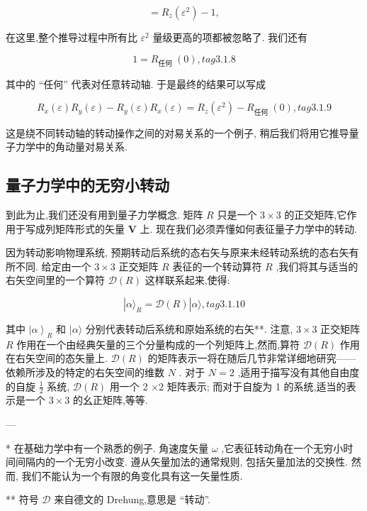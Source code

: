 $$
= {R}_{z}\left( {\varepsilon }^{2}\right) - 1,
$$

在这里,整个推导过程中所有比 ${\varepsilon }^{2}$ 量级更高的项都被忽略了. 我们还有

$$
1 = {R}_{\text{任何 }}\left( 0\right) , tag{3.1.8}
$$

其中的 “任何” 代表对任意转动轴. 于是最终的结果可以写成

$$
{R}_{x}\left( \varepsilon \right) {R}_{y}\left( \varepsilon \right) - {R}_{y}\left( \varepsilon \right) {R}_{x}\left( \varepsilon \right) = {R}_{z}\left( {\varepsilon }^{2}\right) - {R}_{\text{任何 }}\left( 0\right) , tag{3.1.9}
$$

这是绕不同转动轴的转动操作之间的对易关系的一个例子, 稍后我们将用它推导量子力学中的角动量对易关系.

\subsection{量子力学中的无穷小转动} 

到此为止,我们还没有用到量子力学概念. 矩阵 $R$ 只是一个 $3 \times 3$ 的正交矩阵,它作用于写成列矩阵形式的矢量 $\mathbf{V}$ 上. 现在我们必须弄懂如何表征量子力学中的转动.

因为转动影响物理系统, 预期转动后系统的态右矢与原来未经转动系统的态右矢有所不同. 给定由一个 $3 \times 3$ 正交矩阵 $R$ 表征的一个转动算符 $R$ ,我们将其与适当的右矢空间里的一个算符 $\mathcal{D}\left( R\right)$ 这样联系起来,使得:

$$
|\alpha {\rangle }_{R} = \mathcal{D}\left( R\right) |\alpha \rangle , tag{3.1.10}
$$

其中 ${\left| \alpha \right\rangle }_{R}$ 和 $|\alpha \rangle$ 分别代表转动后系统和原始系统的右矢**. 注意, $3 \times 3$ 正交矩阵 $R$ 作用在一个由经典矢量的三个分量构成的一个列矩阵上,然而,算符 $\mathcal{D}\left( R\right)$ 作用在右矢空间的态矢量上. $\mathcal{D}\left( R\right)$ 的矩阵表示一将在随后几节非常详细地研究——依赖所涉及的特定的右矢空间的维数 $N$ . 对于 $N = 2$ ,适用于描写没有其他自由度的自旋 $\frac{1}{2}$ 系统, $\mathcal{D}\left( R\right)$ 用一个 2 $\times 2$ 矩阵表示; 而对于自旋为 1 的系统,适当的表示是一个 $3 \times 3$ 的幺正矩阵,等等.

---

* 在基础力学中有一个熟悉的例子. 角速度矢量 $\omega$ ,它表征转动角在一个无穷小时间间隔内的一个无穷小改变. 遵从矢量加法的通常规则, 包括矢量加法的交换性. 然而, 我们不能认为一个有限的角变化具有这一矢量性质.

** 符号 $\mathcal{D}$ 来自德文的 Drehung,意思是 “转动”.

